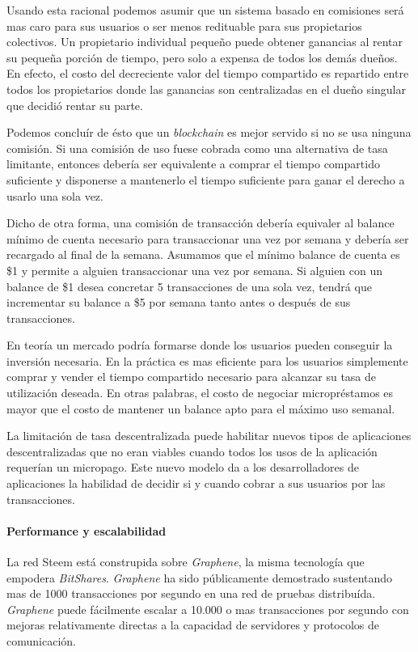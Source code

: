 \documentclass[a4paper,titlepage,final]{article}
\begin{document}
Usando esta racional podemos asumir que un sistema basado en comisiones será mas caro para sus usuarios o ser menos redituable para sus propietarios colectivos. Un propietario individual pequeño puede obtener ganancias al rentar su pequeña porción de tiempo, pero solo a expensa de todos los demás dueños. En efecto, el costo del decreciente valor del tiempo compartido es repartido entre todos los propietarios donde las ganancias son centralizadas en el dueño singular que decidió rentar su parte.

Podemos concluír de ésto que un \textit{blockchain} es mejor servido si no se usa ninguna comisión. Si una comisión de uso fuese cobrada como una alternativa de tasa limitante, entonces debería ser equivalente a comprar el tiempo compartido suficiente y disponerse a mantenerlo el tiempo suficiente para ganar el derecho a usarlo una sola vez.

Dicho de otra forma, una comisión de transacción debería equivaler al balance mínimo de cuenta necesario para transaccionar una vez por semana y debería ser recargado al final de la semana. Asumamos que el mínimo balance de cuenta es \$1 y permite a alguien transaccionar una vez por semana. Si alguien con un balance de \$1 desea concretar 5 transacciones de una sola vez, tendrá que incrementar su balance a \$5 por semana tanto antes o después de sus transacciones.

En teoría un mercado podría formarse donde los usuarios pueden conseguir la inversión necesaria. En la práctica es mas eficiente para los usuarios simplemente comprar y vender el tiempo compartido necesario para alcanzar su tasa de utilización deseada. En otras palabras, el costo de negociar micropréstamos es mayor que el costo de mantener un balance apto para el máximo uso semanal.

La limitación de tasa descentralizada puede habilitar nuevos tipos de aplicaciones descentralizadas que no eran viables cuando todos los usos de la aplicación requerían un micropago. Este nuevo modelo da a los desarrolladores de aplicaciones la habilidad de decidir si y cuando cobrar a sus usuarios por las transacciones.

\paragraph{Performance y escalabilidad}

La red Steem está construpida sobre \textit{Graphene}, la misma tecnología que empodera \textit{BitShares}. \textit{Graphene} ha sido públicamente demostrado sustentando mas de 1000 transacciones por segundo en una red de pruebas distribuída. \textit{Graphene} puede fácilmente escalar a 10.000 o mas transacciones por segundo con mejoras relativamente directas a la capacidad de servidores y protocolos de comunicación.
\end{document}
